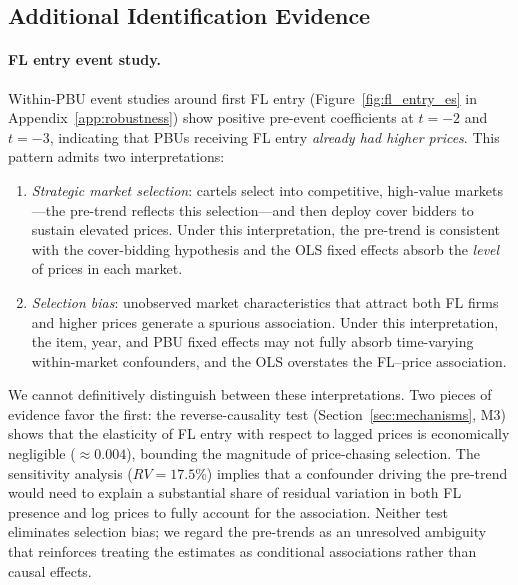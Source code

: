 
\subsection{Additional Identification Evidence}
\label{sec:additional_id}

\paragraph{FL entry event study.}Within-PBU event studies around first FL entry
(Figure~\ref{fig:fl_entry_es} in Appendix~\ref{app:robustness}) show
positive pre-event coefficients at $t = -2$ and $t = -3$, indicating
that PBUs receiving FL entry \emph{already had higher prices}. This
pattern admits two interpretations:

\begin{enumerate}
  \item \emph{Strategic market selection}: cartels select into
    competitive, high-value markets---the pre-trend reflects this
    selection---and then deploy cover bidders to sustain elevated prices.
    Under this interpretation, the pre-trend is consistent with the
    cover-bidding hypothesis and the OLS fixed effects absorb the
    \emph{level} of prices in each market.
  \item \emph{Selection bias}: unobserved market characteristics that
    attract both FL firms and higher prices generate a spurious
    association. Under this interpretation, the item, year, and PBU
    fixed effects may not fully absorb time-varying within-market
    confounders, and the OLS overstates the FL--price association.
\end{enumerate}

\noindent We cannot definitively distinguish between these
interpretations. Two pieces of evidence favor the first: the
reverse-causality test (Section~\ref{sec:mechanisms}, M3) shows
that the elasticity of FL entry with respect to lagged prices is
economically negligible ($\approx 0.004$), bounding the magnitude of
price-chasing selection. The sensitivity analysis ($RV = 17.5\%$)
implies that a confounder driving the pre-trend would need to explain
a substantial share of residual variation in both FL presence and log
prices to fully account for the association. Neither test eliminates
selection bias; we regard the pre-trends as an unresolved ambiguity
that reinforces treating the estimates as conditional associations
rather than causal effects.

